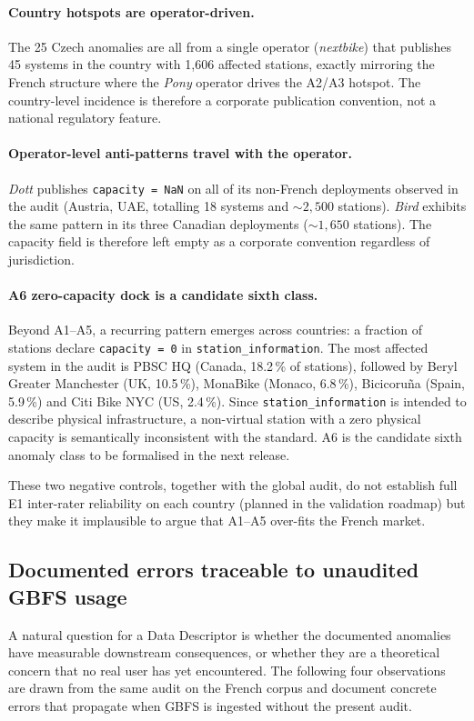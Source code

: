 \documentclass[11pt,a4paper]{article}
\begin{document}
\paragraph{Country hotspots are operator-driven.}
The 25 Czech anomalies are all from a single operator (\emph{nextbike})
that publishes 45 systems in the country with 1{,}606 affected
stations, exactly mirroring the French structure where the
\emph{Pony} operator drives the A2/A3 hotspot. The country-level
incidence is therefore a corporate publication convention, not a
national regulatory feature.

\paragraph{Operator-level anti-patterns travel with the operator.}
\emph{Dott} publishes \texttt{capacity = NaN} on all of its
non-French deployments observed in the audit (Austria, UAE, totalling
18 systems and $\sim 2{,}500$ stations). \emph{Bird} exhibits the
same pattern in its three Canadian deployments
($\sim 1{,}650$ stations). The capacity field is therefore left
empty as a corporate convention regardless of jurisdiction.

\paragraph{A6 zero-capacity dock is a candidate sixth class.}
Beyond A1--A5, a recurring pattern emerges across countries: a
fraction of stations declare \texttt{capacity = 0} in
\texttt{station\_information}. The most affected system in the audit
is PBSC HQ (Canada, 18.2\,\% of stations), followed by Beryl
Greater Manchester (UK, 10.5\,\%), MonaBike (Monaco, 6.8\,\%),
Bicicoru\~na (Spain, 5.9\,\%) and Citi Bike NYC (US, 2.4\,\%). Since
\texttt{station\_information} is intended to describe physical
infrastructure, a non-virtual station with a zero physical capacity
is semantically inconsistent with the standard. A6 is the candidate
sixth anomaly class to be formalised in the next release.

These two negative controls, together with the global audit, do not
establish full E1 inter-rater reliability on each country (planned
in the validation roadmap) but they make it implausible to argue
that A1--A5 over-fits the French market.

\subsection{Documented errors traceable to unaudited GBFS usage}\label{secConsequences}
A natural question for a Data Descriptor is whether the documented
anomalies have measurable downstream consequences, or whether they
are a theoretical concern that no real user has yet encountered. The
following four observations are drawn from the same audit on the
French corpus and document concrete errors that propagate when GBFS
is ingested without the present audit.
\end{document}
